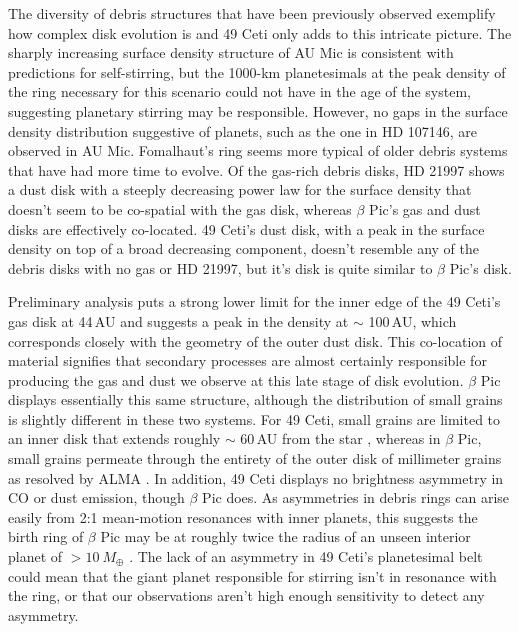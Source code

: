 The diversity of debris structures that have been previously observed exemplify how complex disk evolution is and 49 Ceti only adds to this intricate picture. The sharply increasing surface density structure of AU Mic is consistent with predictions for self-stirring, but the 1000-km planetesimals at the peak density of the ring necessary for this scenario could not have in the age of the system, suggesting planetary stirring may be responsible. However, no gaps in the surface density distribution suggestive of planets, such as the one in HD 107146, are observed in AU Mic. Fomalhaut's ring seems more typical of older debris systems that have had more time to evolve. Of the gas-rich debris disks, HD 21997 shows a dust disk with a steeply decreasing power law for the surface density that doesn't seem to be co-spatial with the gas disk, whereas $\beta$ Pic's gas and dust disks are effectively co-located. 49 Ceti's dust disk, with a peak in the surface density on top of a broad decreasing component, doesn't resemble any of the debris disks with no gas or HD 21997, but it's disk is quite similar to $\beta$ Pic's disk.

Preliminary analysis puts a strong lower limit for the inner edge of the 49 Ceti's gas disk at 44\,AU and suggests a peak in the density at $\sim$ 100\,AU, which corresponds closely with the geometry of the outer dust disk. This co-location of material signifies that secondary processes are almost certainly responsible for producing the gas and dust we observe at this late stage of disk evolution. $\beta$ Pic displays essentially this same structure, although the distribution of small grains is slightly different in these two systems. For 49 Ceti, small grains are limited to an inner disk that extends roughly $\sim$ 60\,AU from the star \citep{Wahh07}, whereas in $\beta$ Pic, small grains permeate through the entirety of the outer disk of millimeter grains as resolved by ALMA \citep{Apai15}. In addition, 49 Ceti displays no brightness asymmetry in CO or dust emission, though $\beta$ Pic does. As asymmetries in debris rings can arise easily from 2:1 mean-motion resonances with inner planets, this suggests the birth ring of $\beta$ Pic may be at roughly twice the radius of an unseen interior planet of $>10~M_{\oplus}$ \citep{Dent14}. The lack of an asymmetry in 49 Ceti's planetesimal belt could mean that the giant planet responsible for stirring isn't in resonance with the ring, or that our observations aren't high enough sensitivity to detect any asymmetry.






